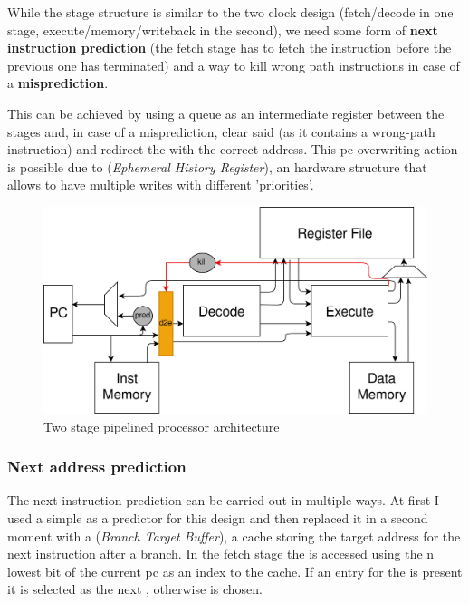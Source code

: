 \documentclass[12pt,oneside,a4paper]{article}
\begin{document}
While the stage structure is similar to the two clock design (fetch/decode in one stage, execute/memory/writeback in the second), we need some form of \textbf{next instruction prediction} (the fetch stage has to fetch the instruction before the previous one has terminated) and a way to kill wrong path instructions in case of a \textbf{misprediction}.

This can be achieved by using a  {\selectfont{FIFO}} queue as an intermediate register between the stages and, in case of a misprediction, clear said  {\selectfont{FIFO}} (as it contains a wrong-path instruction) and redirect the {\selectfont{pc}} with the correct address. This pc-overwriting action is possible due to  {\selectfont{EHR}} (\textit{Ephemeral History Register}), an hardware structure that allows to have multiple writes with different 'priorities'.

\begin{figure}[h]
	\centering
	\includegraphics[scale=0.9]{twoStage.png}
	\caption{Two stage pipelined processor architecture}
	\label{twostage}
\end{figure}
\subsubsection{Next address prediction}
The next instruction prediction can be carried out in multiple ways. At first I used a simple {\selectfont{pc+4}} as a predictor for this design and then replaced it in a second moment with a {\selectfont{BTB}} (\textit{Branch Target Buffer}), a cache storing the target address for the next instruction after a branch. In the fetch stage the  {\selectfont{BTB}} is accessed using the n lowest bit of the current pc as an index to the cache. If an entry for the  {\selectfont{pc}} is present it is selected as the next  {\selectfont{pc}}, otherwise {\selectfont{pc+4}} is chosen.
\end{document}
